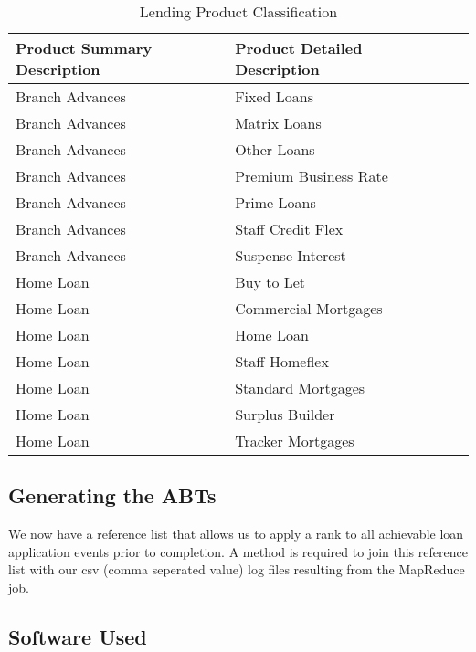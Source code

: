 \begin{table}[H]
	\centering
	\label{my-label}
	\begin{tabular}{|l|p{3.5cm}|p{4cm}|l|}
		\hline
		\textbf{Product Summary Description} & \textbf{Product Detailed Description} \\ \hline
		Branch Advances     & Fixed Loans \\ \hline
		Branch Advances     & Matrix Loans \\ \hline
		Branch Advances     & Other Loans \\ \hline
		Branch Advances     & Premium Business Rate \\ \hline
		Branch Advances     & Prime Loans \\ \hline
		Branch Advances     & Staff Credit Flex \\ \hline
		Branch Advances		& Suspense Interest \\ \hline
		Home Loan           & Buy to Let \\ \hline
		Home Loan           & Commercial Mortgages \\ \hline
		Home Loan           & Home Loan \\ \hline
		Home Loan           & Staff Homeflex \\ \hline
		Home Loan           & Standard Mortgages \\ \hline	
		Home Loan           & Surplus Builder \\ \hline		
		Home Loan           & Tracker Mortgages \\ \hline		
	\end{tabular}
	\caption{Lending Product Classification }
\end{table}

\subsection{Generating the ABTs}
We now have a reference list that allows us to apply a rank to all achievable loan application events prior to completion. A method is required to join this reference list with our csv (comma seperated value) log files resulting from the MapReduce job. 

\subsection{Software Used}\label{softwareUsed}

